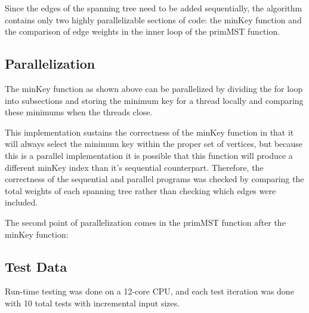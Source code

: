 \documentclass[conference]{IEEEtran}
\begin{document}


Since the edges of the spanning tree need to be added sequentially, the algorithm contains only two highly parallelizable sections of code: the minKey function and the comparison of edge weights in the inner loop of the primMST function.
\newpage

\subsection{Parallelization}
The minKey function as shown above can be parallelized by dividing the for loop into subsections and storing the minimum key for a thread locally and comparing these minimums when the threads close.



This implementation sustains the correctness of the minKey function in that it will always select the minimum key within the proper set of vertices, but because this is a parallel implementation it is possible that this function will produce a different minKey index than it's sequential counterpart. Therefore, the correctness of the sequential and parallel programs was checked by comparing the total weights of each spanning tree rather than checking which edges were included.
\par
The second point of parallelization comes in the primMST function after the minKey function:


\subsection{Test Data}

Run-time testing was done on a 12-core CPU, and each test iteration was done with 10 total tests with incremental input sizes.
\end{document}
